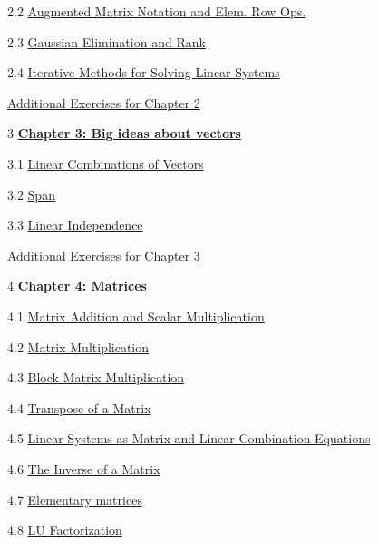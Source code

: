 \documentclass{ximera}
\begin{document}
2.2	\href{https://ximera.osu.edu/oerlinalg/LinearAlgebra/SYS-0030/main}{Augmented Matrix Notation and Elem. Row Ops.}
	
2.3	\href{https://ximera.osu.edu/oerlinalg/LinearAlgebra/SYS-0030/main}{Gaussian Elimination and Rank}
	
2.4	\href{https://ximera.osu.edu/oerlinalg/LinearAlgebra/SYS-0040/main}{Iterative Methods for Solving Linear Systems}
	
	\href{https://ximera.osu.edu/oerlinalg/LinearAlgebra/SUPX-0020/main}{Additional Exercises for Chapter 2}
	
3	\href{https://ximera.osu.edu/oerlinalg/LinearAlgebra/XLAChapter_bigIdeas/main}{\textbf{Chapter 3: Big ideas about vectors}}
	
3.1	\href{https://ximera.osu.edu/oerlinalg/LinearAlgebra/VEC-0040/main}{Linear Combinations of Vectors}
	
3.2	\href{https://ximera.osu.edu/oerlinalg/LinearAlgebra/VEC-0090/main}{Span}
	
3.3	\href{https://ximera.osu.edu/oerlinalg/LinearAlgebra/VEC-0100/main}{Linear Independence}
	
	\href{https://ximera.osu.edu/oerlinalg/LinearAlgebra/SUPX-0030/main}{Additional Exercises for Chapter 3}
	
4	\href{https://ximera.osu.edu/oerlinalg/LinearAlgebra/XLAChapter_matrices/main}{\textbf{Chapter 4: Matrices}}
	
4.1	\href{https://ximera.osu.edu/oerlinalg/LinearAlgebra/MAT-0010/main}{Matrix Addition and Scalar Multiplication}
	
4.2	\href{https://ximera.osu.edu/oerlinalg/LinearAlgebra/MAT-0020/main}{Matrix Multiplication}
	
4.3	\href{https://ximera.osu.edu/oerlinalg/LinearAlgebra/MAT-0023/main}{Block Matrix Multiplication}
	
4.4	\href{https://ximera.osu.edu/oerlinalg/LinearAlgebra/MAT-0025/main}{Transpose of a Matrix}
	
4.5	\href{https://ximera.osu.edu/oerlinalg/LinearAlgebra/MAT-0030/main}{Linear Systems as Matrix and Linear Combination Equations}
	
4.6	\href{https://ximera.osu.edu/oerlinalg/LinearAlgebra/MAT-0050/main}{The Inverse of a Matrix}
	
4.7	\href{https://ximera.osu.edu/oerlinalg/LinearAlgebra/MAT-0060/main}{Elementary matrices}
	
4.8	\href{https://ximera.osu.edu/oerlinalg/LinearAlgebra/MAT-0070/main}{LU Factorization}
	
\end{document}

